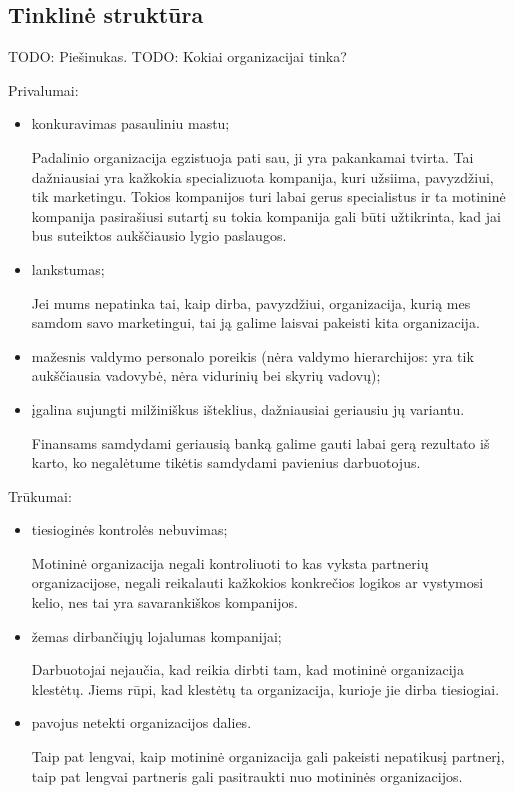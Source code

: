 \subsection{Tinklinė struktūra}

TODO: Piešinukas.
TODO: Kokiai organizacijai tinka?

Privalumai:
\begin{itemize}
  \item konkuravimas pasauliniu mastu;
    \begin{note}
      Padalinio organizacija egzistuoja pati sau, ji yra pakankamai
      tvirta. Tai dažniausiai yra kažkokia specializuota kompanija,
      kuri užsiima, pavyzdžiui, tik marketingu. Tokios kompanijos
      turi labai gerus specialistus ir ta motininė kompanija pasirašiusi
      sutartį su tokia kompanija gali būti užtikrinta, kad jai bus
      suteiktos aukščiausio lygio paslaugos.
    \end{note}
  \item lankstumas;
    \begin{note}
      Jei mums nepatinka tai, kaip dirba, pavyzdžiui, organizacija, kurią
      mes samdom savo marketingui, tai ją galime laisvai pakeisti
      kita organizacija.
    \end{note}
  \item mažesnis valdymo personalo poreikis (nėra valdymo hierarchijos:
    yra tik aukščiausia vadovybė, nėra vidurinių bei skyrių vadovų);
  \item įgalina sujungti milžiniškus išteklius, dažniausiai geriausiu jų
    variantu.
    \begin{exmp}
      Finansams samdydami geriausią banką galime gauti labai gerą
      rezultato iš karto, ko negalėtume tikėtis samdydami pavienius
      darbuotojus.
    \end{exmp}
\end{itemize}

Trūkumai:
\begin{itemize}
  \item tiesioginės kontrolės nebuvimas;
    \begin{note}
      Motininė organizacija negali kontroliuoti to kas vyksta partnerių
      organizacijose, negali reikalauti kažkokios konkrečios logikos
      ar vystymosi kelio, nes tai yra savarankiškos kompanijos.
    \end{note}
  \item žemas dirbančiųjų lojalumas kompanijai;
    \begin{note}
      Darbuotojai nejaučia, kad reikia dirbti tam, kad motininė
      organizacija klestėtų. Jiems rūpi, kad klestėtų ta organizacija,
      kurioje jie dirba tiesiogiai.
    \end{note}
  \item pavojus netekti organizacijos dalies.
    \begin{note}
      Taip pat lengvai, kaip motininė organizacija gali pakeisti
      nepatikusį partnerį, taip pat lengvai partneris gali pasitraukti
      nuo motininės organizacijos.
    \end{note}
\end{itemize}

